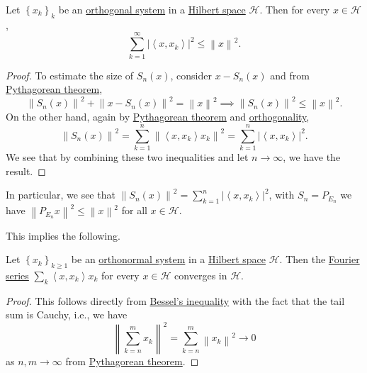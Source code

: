 \begin{theorem}\label{thm:Bessel-ineq}
	Let \(\left\{ x_k \right\} _k\) be an \hyperref[def:orthogonal-system]{orthogonal system} in a \hyperref[def:Hilbert-space]{Hilbert space} \(\mathcal{H} \). Then for every \(x\in \mathcal{H} \),
	\[
		\sum_{k=1}^{\infty}  \left\vert \left\langle x, x_{k}  \right\rangle  \right\vert ^{2} \leq \left\lVert x\right\rVert ^{2} .
	\]
\end{theorem}
\begin{proof}
	To estimate the size of \(S_n(x)\), consider \(x - S_n(x)\) and from \hyperref[thm:Pythagorean-theorem]{Pythagorean theorem},
	\[
		\left\lVert S_n(x)\right\rVert ^{2} + \left\lVert x - S_n (x)\right\rVert ^{2} = \left\lVert x\right\rVert ^{2} \implies \left\lVert S_{n} (x)\right\rVert ^{2} \leq \left\lVert x\right\rVert ^{2}.
	\]
	On the other hand, again by \hyperref[thm:Pythagorean-theorem]{Pythagorean theorem} and \hyperref[def:orthogonal]{orthogonality},
	\[
		\left\lVert S_{n} (x)\right\rVert ^{2} = \sum_{k=1} ^n \left\lVert \left\langle x, x_k \right\rangle x_k \right\rVert ^{2} = \sum_{k=1} ^n \left\vert \left\langle x, x_k \right\rangle  \right\vert ^{2} .
	\]
	We see that by combining these two inequalities and let \(n\to \infty \), we have the result.
\end{proof}
\begin{remark}
	In particular, we see that \(\left\lVert S_n (x)\right\rVert ^{2} = \sum_{k=1}^{n} \left\vert \left\langle x, x_{k}  \right\rangle \right\vert ^{2}\), with \(S_n = P_{E_n}\) we have \(\left\lVert P_{E_n} x \right\rVert^{2} \leq \left\lVert x\right\rVert ^{2}\) for all \(x\in \mathcal{H} \).
\end{remark}

This implies the following.

\begin{corollary}\label{col:lec4}
	Let \(\left\{ x_k \right\} _{k \geq 1}\) be an \hyperref[def:orthonormal-system]{orthonormal system} in a \hyperref[def:Hilbert-space]{Hilbert space} \(\mathcal{H} \). Then the \hyperref[def:Fourier-series]{Fourier series} \(\sum_{k} \left\langle x, x_{k}  \right\rangle x_{k}  \) for every \(x\in \mathcal{H} \) converges in \(\mathcal{H} \).
\end{corollary}
\begin{proof}
	This follows directly from \hyperref[thm:Bessel-ineq]{Bessel's inequality} with the fact that the tail sum is Cauchy, i.e., we have
	\[
		\left\lVert \sum_{k=n}^m x_k\right\rVert ^2 = \sum_{k=n} ^m \left\lVert x_k\right\rVert ^{2} \to 0
	\]
	as \(n, m \to \infty \) from \hyperref[thm:Pythagorean-theorem]{Pythagorean theorem}.
\end{proof}

